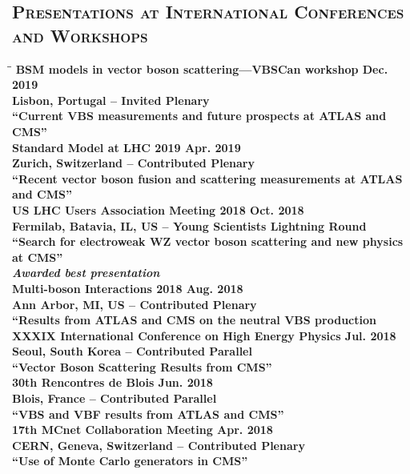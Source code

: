 \documentclass[10pt]{res} %
\begin{document}
\begin{resume}
\section{\textsc{Presentations at International Conferences and Workshops}}
\vspace{-0.1in}
\begin{tabbing}
\hspace{2.3in}\= \hspace{2.6in}\= \kill %
\bf{BSM models in vector boson scattering---VBSCan workshop} 		 \> \>	    Dec. 2019 \\
Lisbon, Portugal -- Invited Plenary\\
``Current VBS measurements and future prospects at ATLAS and CMS'' \\
\bf{Standard Model at LHC 2019} 		 \> \>	    Apr. 2019 \\
Zurich, Switzerland -- Contributed Plenary \\
``Recent vector boson fusion and scattering measurements at ATLAS and CMS'' \\
\bf{US LHC Users Association Meeting 2018} 		 \> \>	    Oct. 2018 \\
Fermilab, Batavia, IL, US -- Young Scientists Lightning Round \\
``Search for electroweak WZ vector boson scattering and new physics at CMS'' \\
\emph{Awarded best presentation } \\
\bf{Multi-boson Interactions 2018} 		 \> \>	    Aug. 2018 \\
Ann Arbor, MI, US -- Contributed Plenary \\
``Results from ATLAS and CMS on the neutral VBS production \\
\bf{XXXIX International Conference on High Energy Physics} 		 \> \>	    Jul. 2018 \\
Seoul, South Korea -- Contributed Parallel\\
``Vector Boson Scattering Results from CMS'' \\
\bf{30th Rencontres de Blois} 		 \> \>	    Jun. 2018 \\
Blois, France -- Contributed Parallel\\
``VBS and VBF results from ATLAS and CMS'' \\
\bf{17th MCnet Collaboration Meeting} 		 \> \>	    Apr. 2018 \\
CERN, Geneva, Switzerland -- Contributed Plenary\\
``Use of Monte Carlo generators in CMS'' \\

\end{tabbing}
\end{resume}
\end{document}
